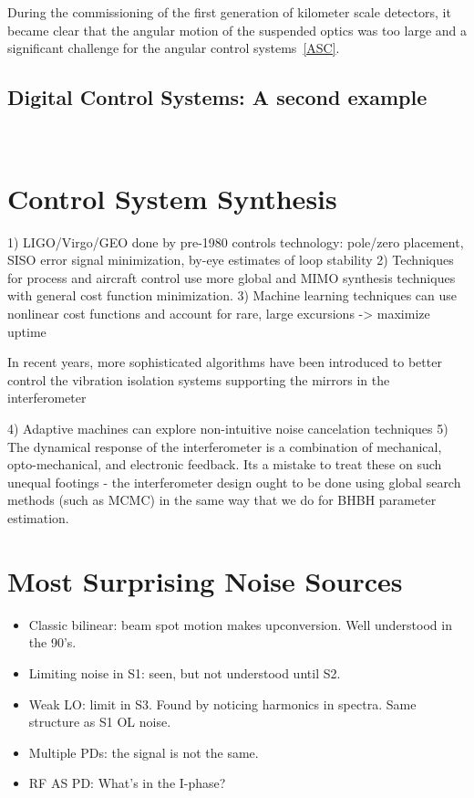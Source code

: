 During the commissioning of the first generation of kilometer scale detectors, it became clear that the angular motion of the suspended optics was too large and a significant challenge for the angular control systems~\ref{ASC}.



\subsection{Digital Control Systems: A second example}

​\section{Control System Synthesis}
  1) LIGO/Virgo/GEO done by pre-1980 controls technology: pole/zero placement, SISO error signal minimization, by-eye estimates of loop stability
  2) Techniques for process and aircraft control use more global and MIMO synthesis techniques with general cost function minimization.
  3) Machine learning techniques can use nonlinear cost functions and account for rare, large excursions -> maximize uptime

In recent years, more sophisticated algorithms have been introduced to
better control the vibration isolation
systems supporting the mirrors in the
interferometer~\cite{Beker:2014, Driggers:2012fl, Ryan:FFW2012}

  4) Adaptive machines can explore non-intuitive noise cancelation techniques​
  5) The dynamical response of the interferometer is a combination of mechanical, opto-mechanical, and electronic feedback. Its a mistake to treat these on such unequal footings - the interferometer design ought to be done using global search methods (such as MCMC) in the same way that we do for BHBH parameter estimation.






\section{Most Surprising Noise Sources}

\begin{itemize}
  \item Classic bilinear: beam spot motion makes upconversion. Well understood in the 90's.
  \item Limiting noise in S1: seen, but not understood until S2.
  \item Weak LO: limit in S3. Found by noticing harmonics in spectra. Same structure as S1 OL noise.
  \item Multiple PDs: the signal is not the same.
  \item RF AS PD: What's in the I-phase?
\end{itemize}


